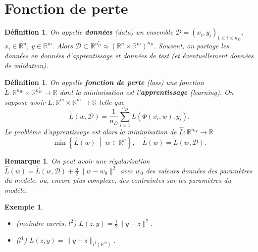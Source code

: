 \documentclass[11pt,a4paper, french]{article}
\newcommand{\nparammodel}{n_W}
\newcommand{\ndata}{n_D}
\newcommand{\ndataall}{n_D^*}
\newcommand{\R}{\mathbb R}
\newcommand{\norm}[1]{\|#1\|}
\newcommand{\SetDef}[2]{\left\{#1\;\middle|\;#2\right\}}
\newtheorem{remark}[theorem]{Remarque}
\newtheorem{definition}[theorem]{Définition}
\newtheorem{example}[theorem]{Exemple}
\begin{document}
\section{Fonction de perte}\label{sec:}
%
%
\begin{definition}\label{definition:}
On appelle \textbf{données} (\textit{data}) un ensemble $\mathcal D=(x_i,y_i)_{1\le i\le \ndata}$, $x_i\in\R^n$, $y\in \R^m$. 
Alors $\mathcal D\subset \R^{\ndataall} \approx \left(\R^n\times \R^m\right)^{\ndata}$. 
Souvent, on partage les données en données d'apprentissage et données de test (et éventuellement données de validation).
\end{definition}
%
%
\begin{definition}\label{definition:Loss}
On appelle \textbf{fonction de perte} (\textit{loss}) une fonction $\widetilde{L}:\R^{\nparammodel}\times\R^{\ndataall}\to \R$ dont la minimisation est l'\textbf{apprentissage} (\textit{learning}). On suppose avoir $L:\R^m\times \R^m\to \R$ telle que
%
\begin{equation}\label{equation:LossForData}
\widetilde{L}(w,\mathcal D) = \frac{1}{\ndata}\sum_{i=1}^{\ndata} L(\Phi(x_i,w),y_i).
\end{equation}
%
Le problème d'apprentissage est alors la minimisation de $\widehat{L}:\R^{\nparammodel}\to\R$
%
\begin{equation}\label{equation:Loss}
\min\SetDef{\widehat{L}(w)}{w\in \R^p},\quad \widehat{L}(w) = \widetilde{L}(w,\mathcal D).
\end{equation}
%
\end{definition}
%
%
\begin{remark}\label{remark:}
On peut avoir une régularisation $\widehat{L}(w) = \widetilde{L}(w,\mathcal D) + \frac{\alpha}{2}\norm{w-w_0}^2$ avec $w_0$ des valeurs données des paramètres du modèle, ou, encore plus complexe, des contraintes sur les paramètres du modèle.
\end{remark}
%
%
\begin{example}\label{example:}
\begin{itemize}
\item (moindre carrés, $l^2$) $L(z,y)= \frac12\norm{y-z}^2$.
\item ($l^1$) $L(z,y)= \norm{y-z}_{l^1(\R^m)}$.
\end{itemize}
\end{example}
%
\end{document}
